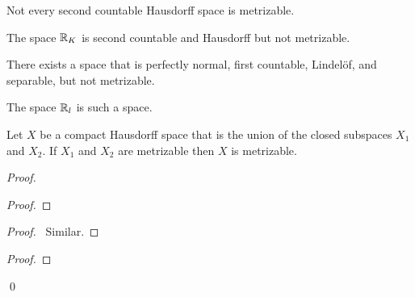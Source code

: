 \begin{example}
    Not every second countable Hausdorff space is metrizable.

    The space $\mathbb{R}_K$ is second countable and Hausdorff but not metrizable.
\end{example}

\begin{example}
    There exists a space that is perfectly normal, first countable, Lindel\"{o}f,
    and separable, but not metrizable.

    The space $\mathbb{R}_l$ is such a space.
\end{example}

\begin{proposition}
    Let $X$ be a compact Hausdorff space that is the union of the closed
    subspaces $X_1$ and $X_2$. If $X_1$ and $X_2$ are metrizable then $X$
    is metrizable.
\end{proposition}

\begin{proof}
    \pf
    \begin{proof}
    \end{proof}
    \begin{proof}
        \pf\ Similar.
    \end{proof}
    \begin{proof}
    \end{proof}
    \qed
\end{proof}

